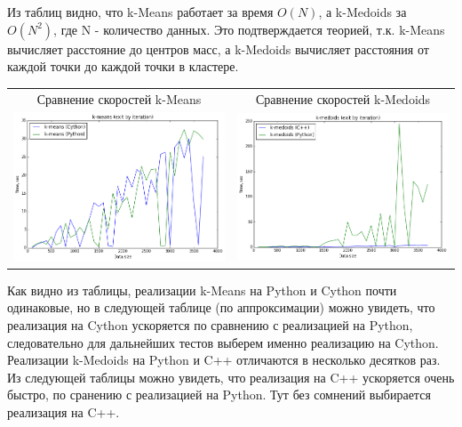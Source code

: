 \documentclass[12pt, a4paper]{article}
\begin{document}
			Из таблиц видно, что k-Means работает за время $O(N)$, а k-Medoids за $O(N^2)$, где N - количество данных. Это подтверждается теорией, т.к. k-Means вычисляет расстояние до центров масс, а k-Medoids вычисляет расстояния от каждой точки до каждой точки в кластере.

			\begin{center}
			\begin{tabular}{c c}
				Сравнение скоростей k-Means &
				Сравнение скоростей k-Medoids \\

				\includegraphics[width=8cm]{python_vs_cython_k_means.png} &
				\includegraphics[width=8cm]{python_vs_cpp_k_medoids.png} \\
			\end{tabular}
			\end{center}

			Как видно из таблицы, реализации k-Means на Python и Cython почти одинаковые, но в следующей таблице (по аппроксимации) можно увидеть, что реализация на Cython ускоряется по сравнению с реализацией на Python, следовательно для дальнейших тестов выберем именно реализацию на Cython. Реализации k-Medoids на Python и C++ отличаются в несколько десятков раз. Из следующей таблицы можно увидеть, что реализация на C++ ускоряется очень быстро, по сранению с реализацией на Python. Тут без сомнений выбирается реализация на C++.
\end{document}
